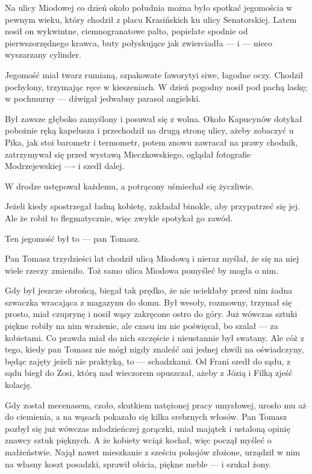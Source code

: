 %
%

Na ulicy Miodowej co dzień około południa można było spotkać
jegomościa w pewnym wieku, który chodził z placu Krasińskich ku ulicy
Senatorskiej. Latem nosił on wykwintne, ciemnogranatowe palto,
popielate spodnie od pierwszorzędnego krawca, buty połyskujące jak
zwierciadła — i — nieco wyszarzany cylinder.

Jegomość miał twarz rumianą, szpakowate faworytyi siwe, łagodne
oczy. Chodził pochylony, trzymając ręce w kieszeniach. W dzień pogodny
nosił pod pachą laskę; w pochmurny — dźwigał jedwabny parasol
angielski.

Był zawsze głęboko zamyślony i posuwał się z wolna. Około Kapucynów
dotykał pobożnie ręką kapelusza i przechodził na drugą stronę ulicy,
ażeby zobaczyć u Pika, jak stoi barometr i termometr, potem znowu
zawracał na prawy chodnik, zatrzymywał się przed wystawą
Mieczkowskiego, oglądał fotografie Modrzejewskiej —- i szedł dalej.

W drodze ustępował każdemu, a potrącony uśmiechał się życzliwie.

Jeżeli kiedy spostrzegał ładną kobietę, zakładał binokle, aby
przypatrzeć się jej. Ale że robił to flegmatycznie, więc zwykle
spotykał go zawód.

Ten jegomość był to — pan Tomasz.

Pan Tomasz trzydzieści lat chodził ulicą Miodową i nieraz myślał, że
się na niej wiele rzeczy zmieniło. Toż samo ulica Miodowa pomyśleć by
mogła o nim.

Gdy był jeszcze obrońcą, biegał tak prędko, że nie uciekłaby przed nim
żadna szwaczka wracająca z magazynu do domu. Był wesoły, rozmowny,
trzymał się prosto, miał czuprynę i nosił wąsy zakręcone ostro do
góry. Już wówczas sztuki piękne robiły na nim wrażenie, ale czasu im
nie poświęcał, bo szalał — za kobietami. Co prawda miał do nich
szczęście i nieustannie był swatany. Ale cóż z tego, kiedy pan Tomasz
nie mógł nigdy znaleźć ani jednej chwili na oświadczyny, będąc zajęty
jeżeli nie praktyką, to — schadzkami. Od Frani szedł do sądu, z sądu
biegł do Zosi, którą nad wieczorem opuszczał, ażeby z Józią i Filką
zjeść kolację.

Gdy został mecenasem, czoło, skutkiem natężonej pracy umysłowej,
urosło mu aż do ciemienia, a na wąsach pokazało się kilka srebrnych
włosów. Pan Tomasz pozbył się już wówczas młodzieńczej gorączki, miał
majątek i ustaloną opinię znawcy sztuk pięknych. A że kobiety wciąż
kochał, więc począł myśleć o małżeństwie. Najął nawet mieszkanie z
sześciu pokojów złożone, urządził w nim na własny koszt posadzki,
sprawił obicia, piękne meble — i szukał żony.

